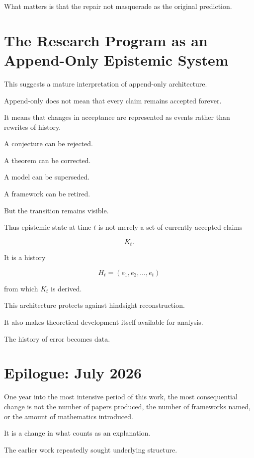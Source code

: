 \documentclass[11pt]{article}
\theoremstyle{remark}
\begin{document}
What matters is that the repair not masquerade as the original prediction.

\section{The Research Program as an Append-Only Epistemic System}

This suggests a mature interpretation of append-only architecture.

Append-only does not mean that every claim remains accepted forever.

It means that changes in acceptance are represented as events rather than
rewrites of history.

A conjecture can be rejected.

A theorem can be corrected.

A model can be superseded.

A framework can be retired.

But the transition remains visible.

Thus epistemic state at time $t$ is not merely a set of currently accepted
claims

\begin{equation}
K_t.
\end{equation}

It is a history

\begin{equation}
H_t
=
(
e_1,e_2,\ldots,e_t
)
\end{equation}

from which $K_t$ is derived.

This architecture protects against hindsight reconstruction.

It also makes theoretical development itself available for analysis.

The history of error becomes data.

\section{Epilogue: July 2026}

One year into the most intensive period of this work, the most consequential
change is not the number of papers produced, the number of frameworks named, or
the amount of mathematics introduced.

It is a change in what counts as an explanation.

The earlier work repeatedly sought underlying structure.
\end{document}

